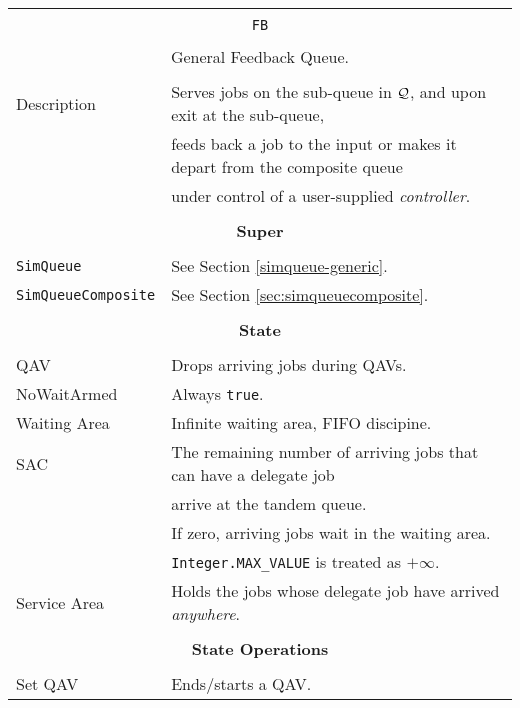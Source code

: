\begin{tabular}{|l|l|}
	\hline
	\multicolumn{2}{|c|}{} \\
	\multicolumn{2}{|c|}{\lstinline[basicstyle=\large]{FB}} \\
	\multicolumn{2}{|c|}{} \\
	\multicolumn{2}{|c|}{General Feedback Queue.} \\
	\multicolumn{2}{|c|}{} \\
	\hline
	Description & Serves jobs on the sub-queue in $\cal{Q}$, and upon exit at the sub-queue, \\
	& feeds back a job to the input or makes it depart from the composite queue \\
	& under control of a user-supplied {\em controller\/}. \\
	\hline
	\multicolumn{2}{|c|}{} \\
	\multicolumn{2}{|c|}{\bf Super} \\
	\multicolumn{2}{|c|}{} \\
	\hline
	\lstinline|SimQueue| & See Section \ref{simqueue-generic}. \\
	\lstinline|SimQueueComposite| & See Section \ref{sec:simqueuecomposite}. \\
	\hline
	\multicolumn{2}{|c|}{} \\
	\multicolumn{2}{|c|}{\bf State} \\
	\multicolumn{2}{|c|}{} \\
	\hline
	QAV & Drops arriving jobs during QAVs. \\
	\hline
	NoWaitArmed & Always \lstinline|true|. \\
	\hline
	Waiting Area & Infinite waiting area, FIFO discipine. \\
	\hline
	SAC & The remaining number of arriving jobs that can have a delegate job \\
	& arrive at the tandem queue. \\
	& If zero, arriving jobs wait in the waiting area. \\
	& \lstinline|Integer.MAX_VALUE| is treated as $+\infty$. \\
	\hline
	Service Area & Holds the jobs whose delegate job have arrived {\em anywhere}. \\
	\hline
	\multicolumn{2}{|c|}{} \\
	\multicolumn{2}{|c|}{\bf State Operations} \\
	\multicolumn{2}{|c|}{} \\
	\hline
	Set QAV & Ends/starts a QAV. \\

\end{tabular}
